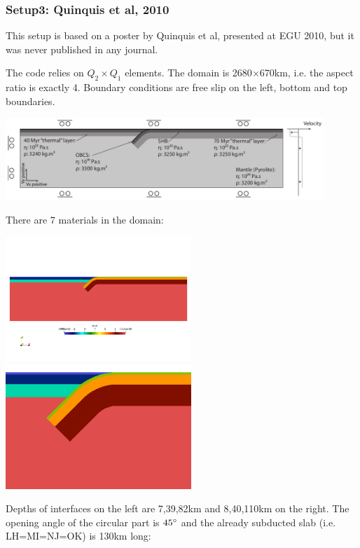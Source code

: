\subsubsection*{Setup3: Quinquis et al, 2010}

This setup is based on a poster by Quinquis et al, presented at EGU 2010, but it
was never published in any journal.

The code relies on $Q_2\times Q_1$ elements. 
The domain is 2680$\times$670km, i.e. the aspect ratio is exactly 4.
Boundary conditions are free slip on the left, bottom and top boundaries. 


\begin{center}
\includegraphics[width=12cm]{python_codes/fieldstone_67/images/setup}
\end{center}

There are 7 materials in the domain:
\begin{center}
\includegraphics[width=7cm]{python_codes/fieldstone_67/images/mats}
\includegraphics[width=7cm]{python_codes/fieldstone_67/images/maats}
\end{center}

Depths of interfaces on the left are 7,39,82km and 8,40,110km on the right.
The opening angle of the circular part is $45\degree$ and the 
already subducted slab (i.e. LH=MI=NJ=OK) is 130km long:

